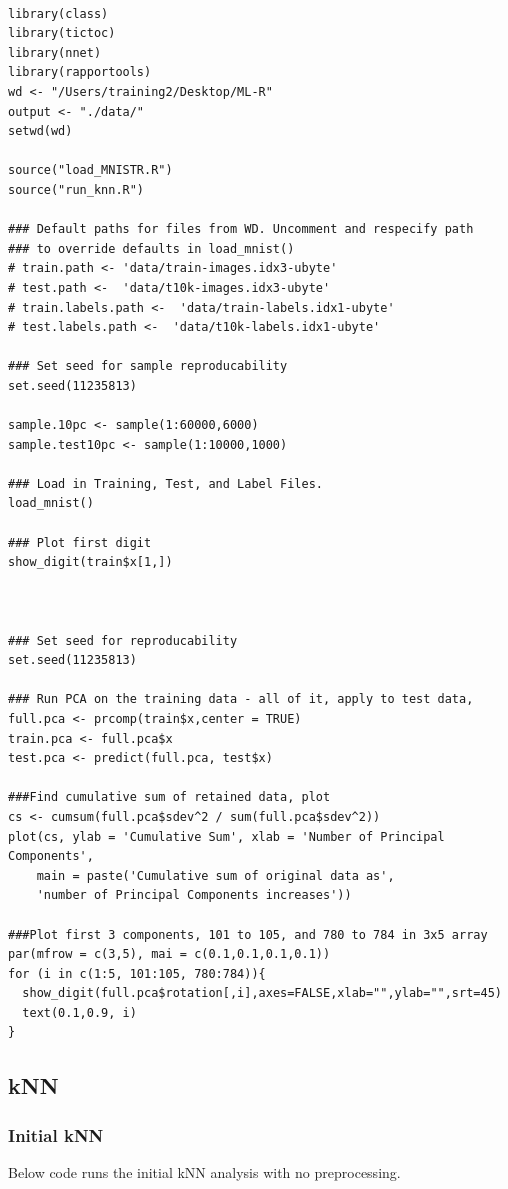 \documentclass[11pt]{article} %
\begin{document}
\begin{lstlisting}

library(class)
library(tictoc)
library(nnet)
library(rapportools)
wd <- "/Users/training2/Desktop/ML-R"
output <- "./data/"
setwd(wd)

source("load_MNISTR.R")
source("run_knn.R")

### Default paths for files from WD. Uncomment and respecify path 
### to override defaults in load_mnist() 
# train.path <- 'data/train-images.idx3-ubyte'
# test.path <-  'data/t10k-images.idx3-ubyte'
# train.labels.path <-  'data/train-labels.idx1-ubyte'
# test.labels.path <-  'data/t10k-labels.idx1-ubyte'

### Set seed for sample reproducability
set.seed(11235813)

sample.10pc <- sample(1:60000,6000)
sample.test10pc <- sample(1:10000,1000)

### Load in Training, Test, and Label Files.
load_mnist()

### Plot first digit 
show_digit(train$x[1,])



### Set seed for reproducability
set.seed(11235813)

### Run PCA on the training data - all of it, apply to test data,
full.pca <- prcomp(train$x,center = TRUE)
train.pca <- full.pca$x
test.pca <- predict(full.pca, test$x)

###Find cumulative sum of retained data, plot
cs <- cumsum(full.pca$sdev^2 / sum(full.pca$sdev^2))
plot(cs, ylab = 'Cumulative Sum', xlab = 'Number of Principal Components', 
	main = paste('Cumulative sum of original data as', 
	'number of Principal Components increases'))

###Plot first 3 components, 101 to 105, and 780 to 784 in 3x5 array
par(mfrow = c(3,5), mai = c(0.1,0.1,0.1,0.1))
for (i in c(1:5, 101:105, 780:784)){
  show_digit(full.pca$rotation[,i],axes=FALSE,xlab="",ylab="",srt=45)
  text(0.1,0.9, i)
}
\end{lstlisting}


\subsection{kNN}
\label{code-knn}
\subsubsection{Initial kNN}
\label{code-init_knn}

Below code runs the initial kNN analysis with no preprocessing. 
\end{document}
